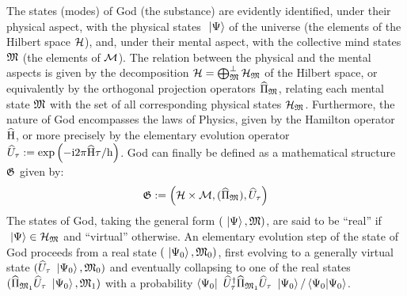 \documentclass[10pt,a4paper,twoside,openany]{book}
\begin{document}
The states (modes) of God (the substance) are evidently identified, under their physical aspect, with the physical states $\ \left|{\Psi}\right\rangle$ of the universe (the elements of the Hilbert space $\mathcal H$), and, under their mental aspect, with the collective mind states $\mathfrak{M}$ (the elements of $\mathcal M$). The relation between the physical and the mental aspects is given by the decomposition $\mathcal H = \bigoplus_{\mathfrak{M}}^\perp \mathcal H_{\mathfrak{M}}$ of the Hilbert space, or equivalently by the orthogonal projection operators $\widehat{\Pi}_{\mathfrak{M}}$, relating each mental state $\mathfrak{M}$ with the set of all corresponding physical states $\mathcal H_{\mathfrak{M}}$. Furthermore, the nature of God encompasses the laws of Physics, given by the Hamilton operator $\widehat{\mathrm H}$, or more precisely by the elementary evolution operator $\widehat{U}_\tau := \mathrm{exp} \left( {- \mathrm{i} 2 \pi \widehat{\mathrm H} \tau / \mathrm h} \right)$. God can finally be defined as a mathematical structure $\mathfrak{G}$ given by:
\begin{equation*}
\mathfrak{G} := \left( \mathcal H \times \mathcal M, (\widehat{\Pi}_{\mathfrak{M}}), \widehat{U}_\tau \right)
\end{equation*}
The states of God, taking the general form $(\ \left|{\Psi}\right\rangle, \mathfrak{M})$, are said to be ``real'' if $\ \left|{\Psi}\right\rangle \in \mathcal H_{\mathfrak{M}}$ and ``virtual'' otherwise. An elementary evolution step of the state of God proceeds from a real state $(\ \left|{\Psi_0}\right\rangle, \mathfrak{M}_0)$, first evolving to a generally virtual state $(\widehat{U}_\tau \ \left|{\Psi_0}\right\rangle, \mathfrak{M}_0)$ and eventually collapsing to one of the real states $(\widehat{\Pi}_{\mathfrak{M}_1} \widehat{U}_\tau \ \left|{\Psi_0}\right\rangle, \mathfrak{M}_1)$ with a probability $\left\langle{\Psi_0}\right|\  \widehat{U}^{\dagger}_\tau \widehat{\Pi}_{\mathfrak{M}_1} \widehat{U}_\tau \ \left|{\Psi_0}\right\rangle / \left\langle{\Psi_0}|{\Psi_0}\right\rangle$.





\end{document}
